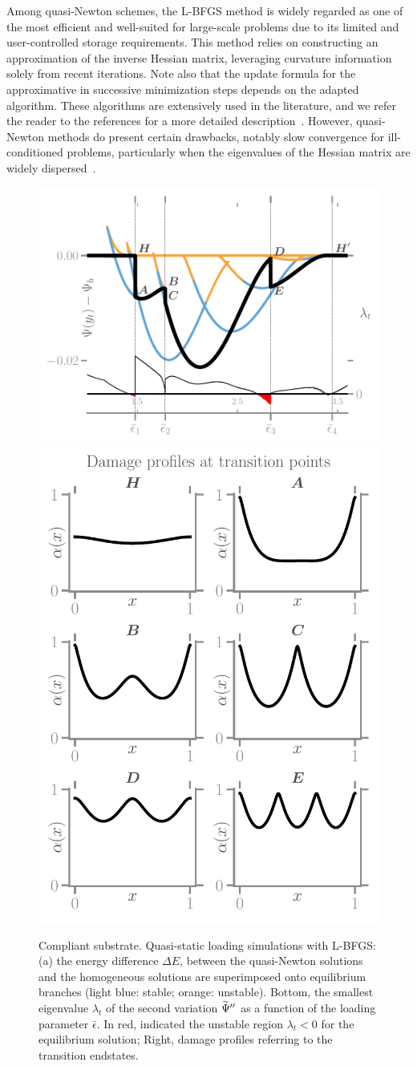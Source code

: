 Among quasi-Newton schemes, the L-BFGS method is widely regarded as one of the most efficient and well-suited for large-scale problems due to its limited and user-controlled storage requirements. This method relies on constructing an approximation of the inverse Hessian matrix, leveraging curvature information solely from recent iterations. Note also that the update formula for the approximative in successive minimization steps depends on the adapted algorithm. These algorithms are extensively used in the literature, and we refer the reader to the references for a more detailed description~\cite{Matthies1979-gl,Xu2001-ax,Nocedal1999-zr,Nocedal2006-qh,Simone2012-tx,Lewis2013-eu,Curtis2015-wp}. However, quasi-Newton methods do present certain drawbacks, notably slow convergence for ill-conditioned problems, particularly when the eigenvalues of the Hessian matrix are widely dispersed~\cite{Simone2012-tx}.
\begin{figure}
    \centering
    \hspace*{-2cm}
    \includegraphics[width=.7\textwidth]{../images/model_compliant_energy_kick.pdf}
    \includegraphics[width=.4\textwidth]{../images/model_compliant_profiles.pdf}
    \caption{
        Compliant substrate. Quasi-static loading simulations with L-BFGS: (a) the energy difference $\Delta E$, between the quasi-Newton solutions and the homogeneous solutions are superimposed onto equilibrium branches (light blue: stable; orange: unstable). Bottom, the smallest eigenvalue $\lambda_t$ of the second variation $\widetilde\Psi''$ as a function of the loading parameter $\bar\epsilon$. In red, indicated the unstable region $\lambda_t<0$ for the equilibrium solution; Right, damage profiles referring to the transition endstates.}
    \label{fig:tempo2}
\end{figure}


